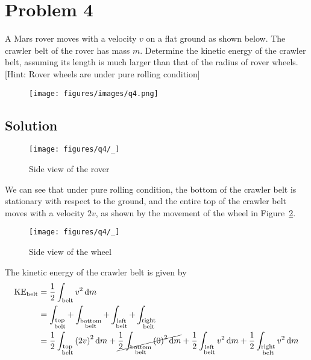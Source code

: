 \section*{Problem 4}

A Mars rover moves with a velocity \(v\) on a flat ground as shown below.
The crawler belt of the rover has mass \(m\).
Determine the kinetic energy of the crawler belt, assuming its length is much larger than that of the radius of rover wheels. [Hint: Rover wheels are under pure rolling condition]

\begin{figure*}[h]
    \centering
    \texttt{[image: figures/images/q4.png]}
\end{figure*}

\subsection*{Solution}

\begin{figure}[htb]
    \centering
    \texttt{[image: figures/q4/\_]}
    \caption{
        Side view of the rover
    }\label{fig:q4-belt}
\end{figure}

We can see that under pure rolling condition, the bottom of the crawler belt is stationary with respect to the ground, and the entire top of the crawler belt moves with a velocity \(2v\), as shown by the movement of the wheel in Figure~\ref{fig:q4-wheel}.

\begin{figure}[htb]
    \centering
    \texttt{[image: figures/q4/\_]}
    \caption{
        Side view of the wheel
    }\label{fig:q4-wheel}
\end{figure}

The kinetic energy of the crawler belt is given by
\begin{align*}
    \text{KE}_{\text{belt}}
     & = \frac{1}{2} \int_{\text{belt}} v^2 \, \text{d}m
    \\ & =
    \int_{\substack{\text{top}
    \\ \text{belt}}}
    + \int_{\substack{\text{bottom}
    \\ \text{belt}}}
    + \int_{\substack{\text{left}
    \\ \text{belt}}}
    + \int_{\substack{\text{right}
    \\ \text{belt}}}
    \\ & =
    \frac{1}{2} \int_{\substack{\text{top}
    \\ \text{belt}}} {(2v)}^2 \, \text{d}m
    + \cancel{\frac{1}{2} \int_{\substack{\text{bottom}
    \\ \text{belt}}} {(0)}^2 \, \text{d}m}
    + \frac{1}{2} \int_{\substack{\text{left}
    \\ \text{belt}}} v^2 \, \text{d}m
    + \frac{1}{2} \int_{\substack{\text{right}
    \\ \text{belt}}} v^2 \, \text{d}m
\end{align*}

